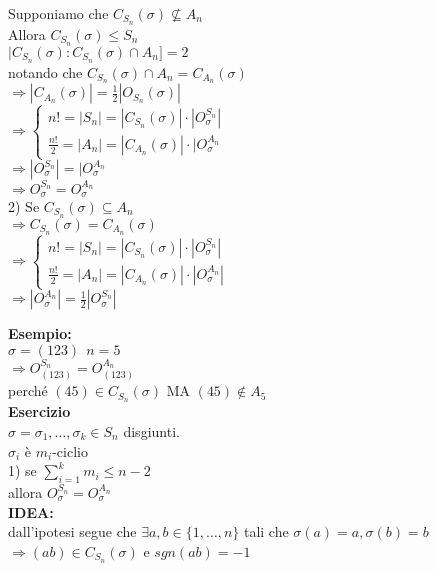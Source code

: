 \documentclass[12px]{article}
\begin{document}
	 \begin{dimo}
		 Supponiamo che $C_{S_n}(\sigma)\not\subseteq A_n$\\
		 Allora  $C_{S_n}(\sigma)\leq S_n$\\
		 $|C_{S_n}(\sigma):C_{S_n}(\sigma)\cap A_n] = 2$\\
		 notando che $C_{S_n}(\sigma)\cap A_n = C_{A_n}(\sigma)$\\
		 $ \Rightarrow |C_{A_n}(\sigma)| = \frac 12 |O_{S_n}(\sigma)|$ \\
		 $ \Rightarrow \begin{cases}
			 n! = |S_n| = |C_{S_n}(\sigma)|\cdot |O_\sigma^{S_n}|\\
			 \frac{n!}2 = |A_n| = |C_{A_n}(\sigma)|\cdot|O_\sigma^{A_n}
		 \end{cases}$ \\
	 $ \Rightarrow |O_\sigma^{S_n}| = |O_\sigma^{A_n}$\\
	 $ \Rightarrow O_\sigma ^{S_n}= O_\sigma^{A_n}$ \\
	 2) Se $C_{S_n}(\sigma)\subseteq A_n$\\
	 $ \Rightarrow C_{S_n}(\sigma) = C_{A_n}(\sigma)$\\
	 $ \Rightarrow \begin{cases}
		 n! = |S_n| = |C_{S_n}(\sigma)|\cdot|O_\sigma^{S_n}|\\
		 \frac{n!}2 = |A_n| = |C_{A_n}(\sigma)|\cdot|O_\sigma^{A_n}|

	 \end{cases}$ \\
	 $ \Rightarrow |O_\sigma ^{A_n}| = \frac 12 |O_\sigma^{S_n}|$
		
	\end{dimo}
	\textbf{Esempio:}\\
	$\sigma = (123) \ \ n = 5$\\
	$ \Rightarrow O^{S_n}_{(123)} = O^{A_n}_{(123)}$\\
	perché $(45)\in C_{S_n}(\sigma)$ MA $(45)\not\in A_5$\\
	\textbf{Esercizio}\\
	$\sigma = \sigma_1,\ldots, \sigma_k\in S_n$ disgiunti.\\
	$\sigma_i$ è $m_i$-ciclio\\
	1) se $\sum^k_{i=1}m_i\leq n-2$\\
	allora $O_\sigma^{S_n} = O_\sigma^{A_n}$ \\
\textbf{IDEA:}\\
dall'ipotesi segue che $\exists a,b\in\{1,\ldots,n\}$ tali che $\sigma(a) = a, \sigma (b) = b$\\
$ \Rightarrow (ab)\in C_{S_n}(\sigma)$ e $sgn(ab) = -1$
\end{document}
